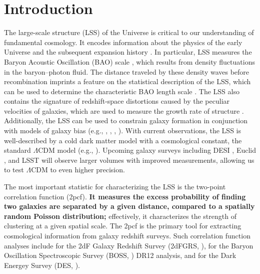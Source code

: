 \documentclass[modern]{aastex62}
\newcommand{\cf}{2pcf\xspace}
\newcommand{\new}[1]{\textbf{#1}}
\begin{document}
\section{Introduction}

The large-scale structure (LSS) of the Universe is critical to our understanding of fundamental cosmology. 
It encodes information about the physics of the early Universe and the subsequent expansion history \citep{SunyaevZeldovich1970, HuSugiyama1996, Riess1998}.
In particular, LSS measures the Baryon Acoustic Oscillation (BAO) scale \citep{Cole2005, Eisenstein2005}, which results from density fluctuations in the baryon--photon fluid.
The distance traveled by these density waves before recombination imprints a feature on the statistical description of the LSS, which can be used to determine the characteristic BAO length scale \citep{PeeblesYu1970, EisensteinHu1998}.
The LSS also contains the signature of redshift-space distortions caused by the peculiar velocities of galaxies, which are used to measure the growth rate of structure \citep{Kaiser1987}.
Additionally, the LSS can be used to constrain galaxy formation in conjunction with models of galaxy bias (e.g., \citealt{Hamilton1988},  \citealt{Li2006}, \citealt{Zehavi2011}, \citealt{Durkalec2018}).
With current observations, the LSS is well-described by a cold dark matter model with a cosmological constant, the standard $\Lambda$CDM model (e.g., \citealt{Alam2016}).
Upcoming galaxy surveys including DESI \citep{Aghamousa2016}, Euclid \citep{Laureijs2011}, and LSST \citep{Ivezic2018} will observe larger volumes with improved measurements, allowing us to test $\Lambda$CDM to even higher precision.

The most important statistic for characterizing the LSS is the two-point correlation function (\cf).
\new{It measures the excess probability of finding two galaxies are separated by a given distance, compared to a spatially random Poisson distribution;} effectively, it characterizes the strength of clustering at a given spatial scale.
The \cf is the primary tool for extracting cosmological information from galaxy redshift surveys.
Such correlation function analyses include \cite{Hawkins2003} for the 2dF Galaxy Redshift Survey (2dFGRS, \citealt{Colless2001}), \cite{Alam2016} for the Baryon Oscillation Spectroscopic Survey (BOSS, \citealt{Dawson2013}) DR12 analysis, and \cite{Elvin-Poole2017} for the Dark Energey Survey (DES, \citealt{DES2005}).
\end{document}
